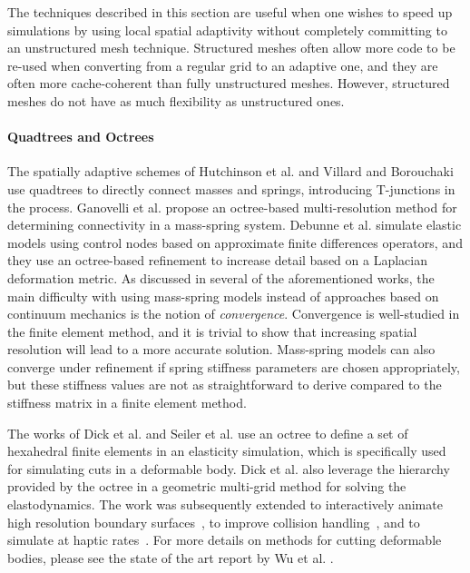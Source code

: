 The techniques described in this section are useful when one wishes to speed up simulations by using local spatial adaptivity without completely committing to an unstructured mesh technique. Structured meshes often allow more code to be re-used when converting from a regular grid to an adaptive one, and they are often more cache-coherent than fully unstructured meshes. However, structured meshes do not have as much flexibility as unstructured ones.

\paragraph*{Quadtrees and Octrees}
The spatially adaptive schemes of Hutchinson et al. \cite{Hutchinson1996} and Villard and Borouchaki \cite{Villard2005} use quadtrees to directly connect masses and springs, introducing T-junctions in the process. Ganovelli et al. \cite{Ganovelli1999} propose an octree-based multi-resolution method for determining connectivity in a mass-spring system. Debunne et al. \cite{Debunne1999} simulate elastic models using control nodes based on approximate finite differences operators, and they use an octree-based refinement to increase detail based on a Laplacian deformation metric. As discussed in several of the aforementioned works, the main difficulty with using mass-spring models instead of approaches based on continuum mechanics is the notion of {\em convergence}. Convergence is well-studied in the finite element method, and it is trivial to show that increasing spatial resolution will lead to a more accurate solution. Mass-spring models can also converge under refinement if spring stiffness parameters are chosen appropriately, but these stiffness values are not as straightforward to derive compared to the stiffness matrix in a finite element method.

The works of Dick et al. \cite{Dick2011} and Seiler et al. \cite{Seiler2011} use an octree to define a set of hexahedral finite elements in an elasticity simulation, which is specifically used for simulating cuts in a deformable body. Dick et al. also leverage the hierarchy provided by the octree in a geometric multi-grid method for solving the elastodynamics.
The work was subsequently extended to interactively animate high resolution boundary surfaces~\cite{Wu2011}, to improve collision handling~\cite{Wu2013}, and to simulate at haptic rates~\cite{Wu2014}. For more details on methods for cutting deformable bodies, please see the state of the art report by Wu et al. \cite{Wu2015}.

